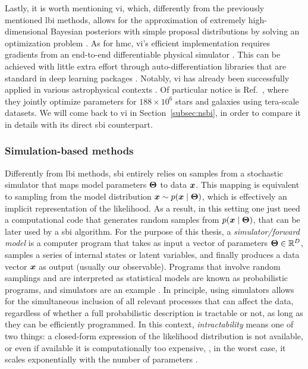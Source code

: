 Lastly, it is worth mentioning \gls*{vi}, which, differently from the previously mentioned \gls*{lbi} methods, allows for the approximation of extremely high-dimensional Bayesian posteriors with simple proposal distributions by solving an optimization problem \cite{hoffman2013stochastic, zhang2018advances}. As for \gls*{hmc}, \gls*{vi}'s efficient implementation requires gradients from an end-to-end differentiable physical simulator \cite[\eg][]{caustic, Morvan_2021, sstrax}. This can be achieved with little extra effort through auto-differentiation libraries that are standard in deep learning packages \cite[\eg][]{pytorch, jax2018github}. Notably, \gls*{vi} has already been successfully applied in various astrophysical contexts \cite{regier2019cataloging, liu2023variational, Mishra-Sharma:2020kjb, Karchev:2021fro, leike2020resolving}. Of particular notice is Ref.~\cite{regier2019cataloging}, where they jointly optimize parameters for $188\times 10^6$ stars and galaxies using tera-scale datasets. We will come back to \gls*{vi} in Section~\ref{subsec:nsbi}, in order to compare it in details with its direct \gls*{sbi} counterpart. 

\subsubsection{Simulation-based methods}

Differently from \gls*{lbi} methods, \gls*{sbi} entirely relies on samples from a stochastic simulator that maps model parameters $\bm{\Theta}$ to data $\bm{x}$. This mapping is equivalent to sampling from the model distribution $\bm{x} \sim p(\bm{x}\mid\bm{\Theta})$, which is effectively an implicit representation of the likelihood. As a result, in this setting one just need a computational code that generates random samples from $p(\bm{x}\mid\bm{\Theta})$, that can be later used by a \gls*{sbi} algorithm. For the purpose of this thesis, a \emph{simulator/forward model} is a computer program that takes as input a vector of parameters $\bm{\Theta} \in \mathbb{R}^D$, samples a series of internal states or latent variables, and finally produces a data vector  $\bm{x}$  as output (usually our observable). Programs that involve random samplings and are interpreted as statistical models are known as probabilistic programs, and simulators are an example \cite{Cranmer:2019eaq}. In principle, using simulators allows for the simultaneous inclusion of all relevant processes that can affect the data, regardless of whether a full probabilistic description is tractable or not, as long as they can be efficiently programmed. In this context, \emph{intractability} means one of two things: a closed-form expression of the likelihood distribution is not available, or even if available it is computationally too expensive, \eg, in the worst case, it scales exponentially with the number of parameters \cite{Leclercq:2018who, Mootoovaloo:2020ott}.

